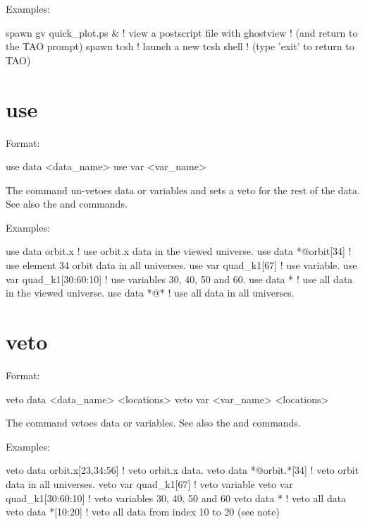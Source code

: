 {Examples:
\begin{example}
  spawn gv quick_plot.ps &      ! view a postscript file with ghostview
                                ! (and return to the TAO prompt)
  spawn tcsh                    ! launch a new tcsh shell 
                                ! (type 'exit' to return to TAO)
\end{example}

\section{use}
\label{s:use}

Format:
\begin{example}
  use data  <data_name>
  use var <var_name>
\end{example}

\vskip 0.2in 
The  command un-vetoes data or variables and sets a veto for
the rest of the data. See also the  and 
commands.

Examples:
\begin{example}
  use data orbit.x             ! use orbit.x data in the viewed universe.
  use data *@orbit[34]         ! use element 34 orbit data in all universes.
  use var quad_k1[67]          ! use variable.
  use var quad_k1[30:60:10]    ! use variables 30, 40, 50 and 60.
  use data *                   ! use all data in the viewed universe.
  use data *@*                 ! use all data in all universes.
\end{example}


\section{veto}
\label{s:veto}

Format:
\begin{example}
  veto data <data_name> <locations>
  veto var <var_name> <locations>
\end{example}

\vskip 0.2in 
The  command vetoes data or variables. See also the
 and  commands.

Examples:
\begin{example}
  veto data orbit.x[23,34:56]  ! veto orbit.x data.
  veto data *@orbit.*[34]      ! veto orbit data in all universes.
  veto var quad_k1[67]         ! veto variable
  veto var quad_k1[30:60:10]   ! veto variables 30, 40, 50 and 60
  veto data *                  ! veto all data
  veto data *[10:20]           ! veto all data from index 10 to 20 (see note)
\end{example}

}
